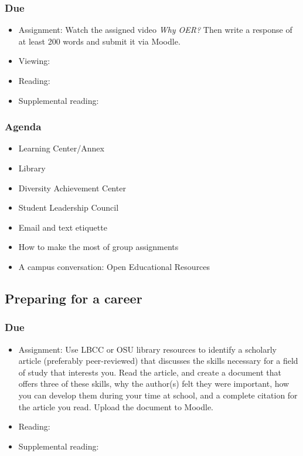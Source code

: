 \documentclass[12pt,article,oneside]{memoir}
\begin{document}
\subsubsection{Due}
\begin{itemize}
 \item Assignment: Watch the assigned video \emph{Why OER?}  Then write a response of at least 200 words and submit it via Moodle. 
 \item Viewing: \cite{oer}
 \item Reading: \cite{wellsley}
 \item Supplemental reading: \cite{oer-dh}
\end{itemize}


\subsubsection{Agenda}
\begin{itemize}
 \item Learning Center/Annex
 \item Library
 \item Diversity Achievement Center
 \item Student Leadership Council
 \item Email and text etiquette
 \item How to make the most of group assignments
 \item A campus conversation: Open Educational Resources
\end{itemize}



\subsection{Preparing for a career}
\subsubsection{Due}
\begin{itemize}
 \item Assignment: Use LBCC or OSU library resources to identify a scholarly article (preferably peer-reviewed) that discusses the skills necessary for a field of study that interests you.  Read the article, and create a document that offers three of these skills, why the author(s) felt they were important, how you can develop them during your time at school, and a complete citation for the article you read.  Upload the document to Moodle.
 \item Reading: \cite{worksheets}
 \item Supplemental reading: \cite{crosswalk,ooh}
\end{itemize}
\end{document}
